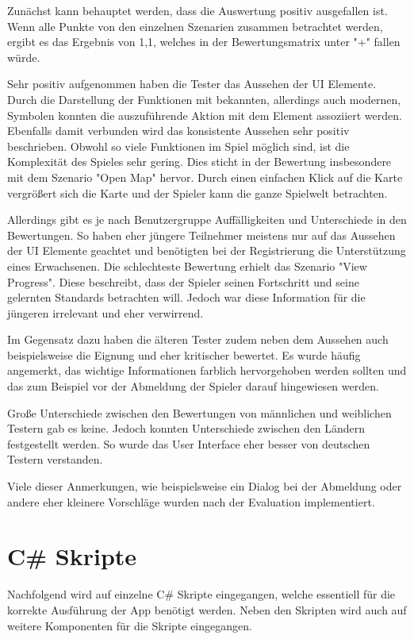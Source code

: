 				Zunächst kann behauptet werden, dass die Auswertung positiv ausgefallen ist. Wenn alle Punkte von den einzelnen Szenarien zusammen betrachtet werden, ergibt es das Ergebnis von 1,1, welches in der Bewertungsmatrix unter "+" fallen würde.

				Sehr positiv aufgenommen haben die Tester das Aussehen der \ac{UI} Elemente. Durch die Darstellung der Funktionen mit bekannten, allerdings auch modernen, Symbolen konnten die auszuführende Aktion mit dem Element assoziiert werden. Ebenfalls damit verbunden wird das konsistente Aussehen sehr positiv beschrieben. Obwohl so viele Funktionen im Spiel möglich sind, ist die Komplexität des Spieles sehr gering. Dies sticht in der Bewertung insbesondere mit dem Szenario "Open Map" hervor. Durch einen einfachen Klick auf die Karte vergrößert sich die Karte und der Spieler kann die ganze Spielwelt betrachten.

				Allerdings gibt es je nach Benutzergruppe Auffälligkeiten und Unterschiede in den Bewertungen. So haben eher jüngere Teilnehmer meistens nur auf das Aussehen der \ac{UI} Elemente geachtet und benötigten bei der Registrierung die Unterstützung eines Erwachsenen. Die schlechteste Bewertung erhielt das Szenario "View Progress". Diese beschreibt, dass der Spieler seinen Fortschritt und seine gelernten Standards betrachten will. Jedoch war diese Information für die jüngeren irrelevant und eher verwirrend.

				Im Gegensatz dazu haben die älteren Tester zudem neben dem Aussehen auch beispielsweise die Eignung und eher kritischer bewertet. Es wurde häufig angemerkt, das wichtige Informationen farblich hervorgehoben werden sollten und das zum Beispiel vor der Abmeldung der Spieler darauf hingewiesen werden.

				Große Unterschiede zwischen den Bewertungen von männlichen und weiblichen Testern gab es keine. Jedoch konnten Unterschiede zwischen den Ländern festgestellt werden. So wurde das User Interface eher besser von deutschen Testern verstanden.

				Viele dieser Anmerkungen, wie beispielsweise ein Dialog bei der Abmeldung oder andere eher kleinere Vorschläge wurden nach der Evaluation implementiert.

	\section{C\# Skripte}
		Nachfolgend wird auf einzelne C\# Skripte eingegangen, welche essentiell für die korrekte Ausführung der App benötigt werden. Neben den Skripten wird auch auf weitere Komponenten für die Skripte eingegangen.

